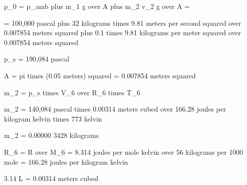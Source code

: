 p_0 = p_amb plus m_1 g over A plus m_2 v_2 g over A =

= 100,000 pascal plus 32 kilograms times 9.81 meters per second squared over 0.007854 meters squared plus 0.1 times 9.81 kilograms per meter squared over 0.007854 meters squared

p_s = 190,084 pascal

A = pi times (0.05 meters) squared = 0.007854 meters squared

m_2 = p_s times V_6 over R_6 times T_6

m_2 = 140,084 pascal times 0.00314 meters cubed over 166.28 joules per kilogram kelvin times 773 kelvin

m_2 = 0.00000 3428 kilograms

R_6 = R over M_6 = 8.314 joules per mole kelvin over 56 kilograms per 1000 mole = 166.28 joules per kilogram kelvin

3.14 L = 0.00314 meters cubed